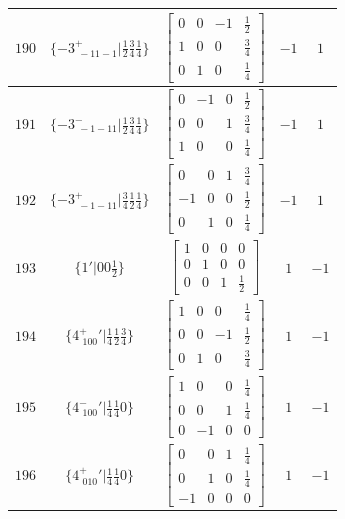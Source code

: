 \documentclass[fleqn,8pt]{jsarticle}
\begin{document}
\begin{longtable}{ccccc}
$ 190 $ & $ \{-3^{+}_{\,\,-11-1}|\frac{1}{2} \frac{3}{4} \frac{1}{4}\} $ & $ \begin{bmatrix} 0 & 0 & -1 & \frac{1}{2} \\ 1 & 0 & 0 & \frac{3}{4} \\ 0 & 1 & 0 & \frac{1}{4} \end{bmatrix} $ & $ -1 $ & $ 1 $ \\ \hline
$ 191 $ & $ \{-3^{-}_{\,\,-1-11}|\frac{1}{2} \frac{3}{4} \frac{1}{4}\} $ & $ \begin{bmatrix} 0 & -1 & 0 & \frac{1}{2} \\ 0 & 0 & 1 & \frac{3}{4} \\ 1 & 0 & 0 & \frac{1}{4} \end{bmatrix} $ & $ -1 $ & $ 1 $ \\ \hline
$ 192 $ & $ \{-3^{+}_{\,\,-1-11}|\frac{3}{4} \frac{1}{2} \frac{1}{4}\} $ & $ \begin{bmatrix} 0 & 0 & 1 & \frac{3}{4} \\ -1 & 0 & 0 & \frac{1}{2} \\ 0 & 1 & 0 & \frac{1}{4} \end{bmatrix} $ & $ -1 $ & $ 1 $ \\ \hline
$ 193 $ & $ \{1{}'|0 0 \frac{1}{2}\} $ & $ \begin{bmatrix} 1 & 0 & 0 & 0 \\ 0 & 1 & 0 & 0 \\ 0 & 0 & 1 & \frac{1}{2} \end{bmatrix} $ & $ 1 $ & $ -1 $ \\ \hline
$ 194 $ & $ \{4^{+}_{\,\,100}{}'|\frac{1}{4} \frac{1}{2} \frac{3}{4}\} $ & $ \begin{bmatrix} 1 & 0 & 0 & \frac{1}{4} \\ 0 & 0 & -1 & \frac{1}{2} \\ 0 & 1 & 0 & \frac{3}{4} \end{bmatrix} $ & $ 1 $ & $ -1 $ \\ \hline
$ 195 $ & $ \{4^{-}_{\,\,100}{}'|\frac{1}{4} \frac{1}{4} 0\} $ & $ \begin{bmatrix} 1 & 0 & 0 & \frac{1}{4} \\ 0 & 0 & 1 & \frac{1}{4} \\ 0 & -1 & 0 & 0 \end{bmatrix} $ & $ 1 $ & $ -1 $ \\ \hline
$ 196 $ & $ \{4^{+}_{\,\,010}{}'|\frac{1}{4} \frac{1}{4} 0\} $ & $ \begin{bmatrix} 0 & 0 & 1 & \frac{1}{4} \\ 0 & 1 & 0 & \frac{1}{4} \\ -1 & 0 & 0 & 0 \end{bmatrix} $ & $ 1 $ & $ -1 $ \\ \hline

\end{longtable}
\end{document}
